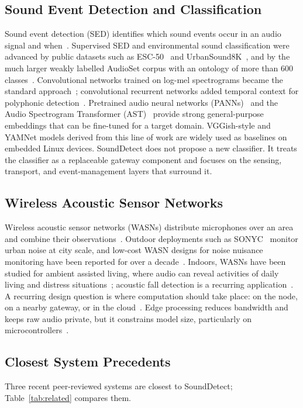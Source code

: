\documentclass[conference]{IEEEtran}
\begin{document}
\subsection{Sound Event Detection and Classification}
Sound event detection (SED) identifies which sound events occur in an audio signal and when~\cite{mesaros2021,stowell2015}. Supervised SED and environmental sound classification were advanced by public datasets such as ESC-50~\cite{piczak2015} and UrbanSound8K~\cite{salamon2014}, and by the much larger weakly labelled AudioSet corpus with an ontology of more than 600 classes~\cite{gemmeke2017}. Convolutional networks trained on log-mel spectrograms became the standard approach~\cite{hershey2017,salamon2017}; convolutional recurrent networks added temporal context for polyphonic detection~\cite{cakir2017}. Pretrained audio neural networks (PANNs)~\cite{kong2020} and the Audio Spectrogram Transformer (AST)~\cite{gong2021} provide strong general-purpose embeddings that can be fine-tuned for a target domain. VGGish-style and YAMNet models derived from this line of work are widely used as baselines on embedded Linux devices. SoundDetect does not propose a new classifier. It treats the classifier as a replaceable gateway component and focuses on the sensing, transport, and event-management layers that surround it.

\subsection{Wireless Acoustic Sensor Networks}
Wireless acoustic sensor networks (WASNs) distribute microphones over an area and combine their observations~\cite{bertrand2011}. Outdoor deployments such as SONYC~\cite{bello2019} monitor urban noise at city scale, and low-cost WASN designs for noise nuisance monitoring have been reported for over a decade~\cite{segura2015}. Indoors, WASNs have been studied for ambient assisted living, where audio can reveal activities of daily living and distress situations~\cite{vacher2011}; acoustic fall detection is a recurring application~\cite{popescu2008}. A recurring design question is where computation should take place: on the node, on a nearby gateway, or in the cloud~\cite{shi2016}. Edge processing reduces bandwidth and keeps raw audio private, but it constrains model size, particularly on microcontrollers~\cite{warden2019}.

\subsection{Closest System Precedents}
Three recent peer-reviewed systems are closest to SoundDetect; Table~\ref{tab:related} compares them.
\end{document}
